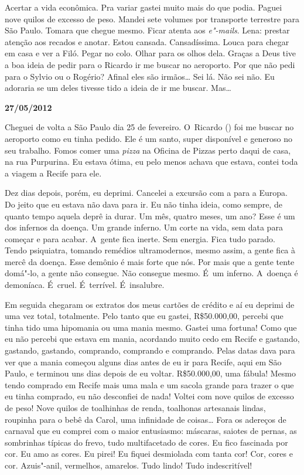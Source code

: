 Acertar a vida econômica. Pra variar gastei muito mais do que podia.
Paguei nove quilos de excesso de peso. Mandei sete volumes por
transporte terrestre para São Paulo. Tomara que chegue mesmo. Ficar
atenta aos \emph{e"-mails}. Lena: prestar atenção aos recados e anotar.
Estou cansada. Cansadíssima. Louca para chegar em casa e ver a Filó.
Pegar no colo. Olhar para os olhos dela. Graças a Deus tive a boa ideia
de pedir para o Ricardo ir me buscar no aeroporto. Por que não pedi para
o Sylvio ou o Rogério? Afinal eles são irmãos… Sei lá. Não sei
não. Eu adoraria se um deles tivesse tido a ideia de ir me buscar.
Mas…

\begin{center}\asterisc{}\end{center}


\begin{flushright}\textbf{27/05/2012}\end{flushright}


Cheguei de volta a São Paulo dia 25 de fevereiro. O~Ricardo () foi me
buscar no aeroporto como eu tinha pedido. Ele é um santo, super
disponível e generoso no seu trabalho. Fomos comer uma \emph{pizza} na
Oficina de Pizzas perto daqui de casa, na rua Purpurina. Eu estava
ótima, eu pelo menos achava que estava, contei toda a viagem a Recife
para ele.

Dez dias depois, porém, eu deprimi. Cancelei a excursão com a  para a
Europa. Do jeito que eu estava não dava para ir. Eu não tinha ideia,
como sempre, de quanto tempo aquela deprê ia durar. Um mês, quatro
meses, um ano? Esse é um dos infernos da doença. Um grande inferno. Um
corte na vida, sem data para começar e para acabar. A~gente fica inerte.
Sem energia. Fica tudo parado. Tendo psiquiatra, tomando remédios
ultramodernos, mesmo assim, a gente fica à mercê da doença. Esse demônio
é mais forte que nós. Por mais que a gente tente domá"-lo, a gente não
consegue. Não consegue mesmo. É~um inferno. A~doença é demoníaca. É~cruel. É~terrível. É~insalubre.

Em seguida chegaram os extratos dos meus cartões de crédito e aí eu
deprimi de uma vez total, totalmente. Pelo tanto que eu gastei,
R\$50.000,00, percebi que tinha tido uma hipomania ou uma mania mesmo.
Gastei uma fortuna! Como que eu não percebi que estava em mania,
acordando muito cedo em Recife e gastando, gastando, gastando,
comprando, comprando e comprando. Pelas datas dava para ver que a mania
começou alguns dias antes de eu ir para Recife, aqui em São Paulo, e
terminou uns dias depois de eu voltar. R\$50.000,00, uma fábula! Mesmo
tendo comprado em Recife mais uma mala e um sacola grande para trazer o
que eu tinha comprado, eu não desconfiei de nada! Voltei com nove quilos
de excesso de peso! Nove quilos de toalhinhas de renda, toalhonas
artesanais lindas, roupinha para o bebê da Carol, uma infinidade de
coisas… Fora os adereços de carnaval que eu comprei com o maior
entusiasmo: máscaras, saiotes de pernas, as sombrinhas típicas do frevo,
tudo multifacetado de cores. Eu fico fascinada por cor. Eu amo as cores.
Eu pirei! Eu fiquei desmiolada com tanta cor! Cor, cores e cor.
Azuis"-anil, vermelhos, amarelos. Tudo lindo! Tudo indescritível!

